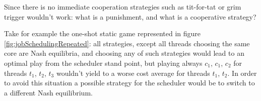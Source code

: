 Since there is no immediate cooperation strategies such as tit-for-tat 
or grim trigger wouldn't work: what is a punishment, and what is a cooperative
strategy? 

Take for example the one-shot static game represented in figure \ref{fig:jobSchedulingRepeated}:
all strategies, except all threads choosing the same core are Nash equilibria, and
choosing any of such strategies would lead to an optimal play from the scheduler stand
point, but playing always $c_1$, $c_1$, $c_2$ for threads $t_1$, $t_2$, $t_3$ wouldn't
yield to a worse cost average for threads $t_1$, $t_2$. In order to avoid this situation
a possible strategy for the scheduler would be to switch to a different Nash equilibrium.

\begin{center}
  \begin{tikzpicture}[thin,
    level 1/.style={sibling distance=40mm},
    level 2/.style={sibling distance=20mm},
    level 3/.style={sibling distance=10mm},
    every circle node/.style={minimum size=1.5mm,inner sep=0mm}]
    

\end{tikzpicture}
\end{center}
